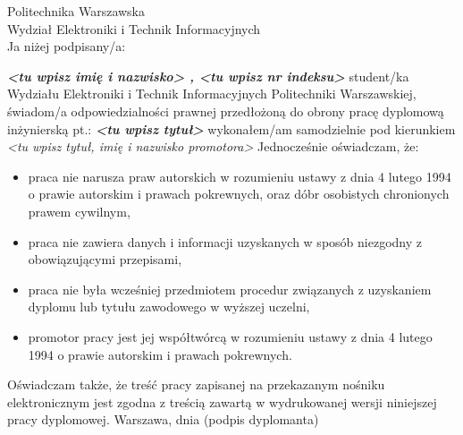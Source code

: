 \setcounter{page}{7}
\vspace{-1.5cm}
\begin{flushleft}
	Politechnika Warszawska \\ 
	Wydział Elektroniki i Technik Informacyjnych \\
	\vspace{0.5cm}
	Ja niżej podpisany/a: 
\end{flushleft}
\center \textit{\textbf{<tu wpisz imię i nazwisko> , <tu wpisz nr indeksu>}} 
\justify student/ka Wydziału Elektroniki i Technik Informacyjnych Politechniki Warszawskiej, świadom/a odpowiedzialności prawnej przedłożoną do obrony pracę dyplomową inżynierską pt.:
\center \textit{\textbf{<tu wpisz tytuł> }} 
\justify wykonałem/am samodzielnie pod kierunkiem
\center \textit{<tu wpisz tytuł, imię i nazwisko promotora> } 
\justify Jednocześnie oświadczam, że: \\
\begin{itemize}
	\item praca nie narusza praw autorskich w rozumieniu ustawy z dnia 4 lutego 1994 o prawie autorskim i prawach pokrewnych, oraz dóbr osobistych chronionych prawem cywilnym,
	\item praca nie zawiera danych i informacji uzyskanych w sposób niezgodny z obowiązującymi przepisami,
	\item praca nie była wcześniej przedmiotem procedur związanych z uzyskaniem dyplomu lub tytułu zawodowego w wyższej uczelni,
	\item promotor pracy jest jej współtwórcą w rozumieniu ustawy z dnia 4 lutego 1994 o prawie autorskim i prawach pokrewnych.
\end{itemize}
\justify Oświadczam także, że treść pracy zapisanej na przekazanym nośniku elektronicznym jest zgodna z treścią zawartą w wydrukowanej wersji niniejszej pracy dyplomowej.
\vfill
Warszawa, dnia  \hfill (podpis dyplomanta) 

\newpage
\thispagestyle{empty}
\phantom{Nothing here}
\newpage
\clearpage
\phantom{Here neither}


